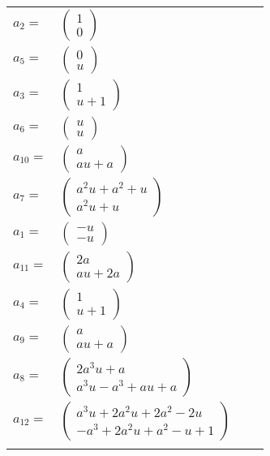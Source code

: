 \documentclass[1p]{elsarticle_modified}
\theoremstyle{definition}
\begin{document}
\begin{tabular}{m{7pt} m{180pt} m{7pt} m{180pt} }
\flushright $a_{2}=$&$\begin{pmatrix}1\\0\end{pmatrix}$ \\
\flushright $a_{5}=$&$\begin{pmatrix}0\\u\end{pmatrix}$ \\
\flushright $a_{3}=$&$\begin{pmatrix}1\\u+1\end{pmatrix}$ \\
\flushright $a_{6}=$&$\begin{pmatrix}u\\u\end{pmatrix}$ \\
\flushright $a_{10}=$&$\begin{pmatrix}a\\a u+a\end{pmatrix}$ \\
\flushright $a_{7}=$&$\begin{pmatrix}a^2 u+a^2+u\\a^2 u+u\end{pmatrix}$ \\
\flushright $a_{1}=$&$\begin{pmatrix}- u\\- u\end{pmatrix}$ \\
\flushright $a_{11}=$&$\begin{pmatrix}2 a\\a u+2 a\end{pmatrix}$ \\
\flushright $a_{4}=$&$\begin{pmatrix}1\\u+1\end{pmatrix}$ \\
\flushright $a_{9}=$&$\begin{pmatrix}a\\a u+a\end{pmatrix}$ \\
\flushright $a_{8}=$&$\begin{pmatrix}2 a^3 u+a\\a^3 u- a^3+a u+a\end{pmatrix}$ \\
\flushright $a_{12}=$&$\begin{pmatrix}a^3 u+2 a^2 u+2 a^2-2 u\\- a^3+2 a^2 u+a^2- u+1\end{pmatrix}$\\&\end{tabular}
\end{document}
